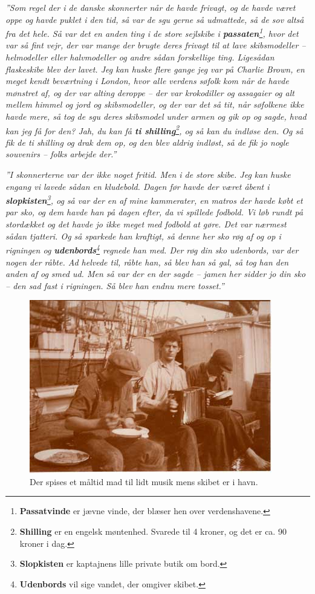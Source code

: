 \emph{''Som regel der i de danske skonnerter når de havde frivagt, og de
havde været oppe og havde puklet i den tid, så var de sgu gerne så
udmattede, så de sov altså fra det hele. Så var det en anden ting i de
store sejlskibe i \textbf{passaten}\footnote{\textbf{Passatvinde} er
  jævne vinde, der blæser hen over verdenshavene.}, hvor det var så fint
vejr, der var mange der brugte deres frivagt til at lave skibsmodeller
-- helmodeller eller halvmodeller og andre sådan forskellige ting.
Ligesådan flaskeskibe blev der lavet. Jeg kan huske flere gange jeg var
på Charlie Brown, en meget kendt beværtning i London, hvor alle verdens
søfolk kom når de havde mønstret af, og der var alting deroppe -- der
var krokodiller og assagaier og alt mellem himmel og jord og
skibsmodeller, og der var det så tit, når søfolkene ikke havde mere, så
tog de sgu deres skibsmodel under armen og gik op og sagde, hvad kan jeg
få for den? Jah, du kan få \textbf{ti shilling}\footnote{\textbf{Shilling}
  er en engelsk møntenhed. Svarede til 4 kroner, og det er ca. 90 kroner
  i dag.}, og så kan du indløse den. Og så fik de ti shilling og drak
dem op, og den blev aldrig indløst, så de fik jo nogle souvenirs --
folks arbejde der.''}

\emph{''I skonnerterne var der ikke noget fritid. Men i de store skibe.
Jeg kan huske engang vi lavede sådan en kludebold. Dagen før havde der
været åbent i \textbf{slopkisten}\footnote{\textbf{Slopkisten} er
  kaptajnens lille private butik om bord.}, og så var der en af mine
kammerater, en matros der havde købt et par sko, og dem havde han på
dagen efter, da vi spillede fodbold. Vi løb rundt på stordækket og det
havde jo ikke meget med fodbold at gøre. Det var nærmest sådan tjatteri.
Og så sparkede han kraftigt, så denne her sko røg af og op i rigningen
og \textbf{udenbords}\footnote{\textbf{Udenbords} vil sige vandet, der
  omgiver skibet.} regnede han med. Der røg din sko udenbords, var der
nogen der råbte. Ad helvede til, råbte han, så blev han så gal, så tog
han den anden af og smed ud. Men så var der en der sagde -- jamen her
sidder jo din sko -- den sad fast i rigningen. Så blev han endnu mere
tosset.''}

\begin{figure}
\centering
\includegraphics{images/sejlskibe_tema-5-spisning.jpg}
\caption{Der spises et måltid mad til lidt musik mens skibet er i havn.}
\end{figure}

